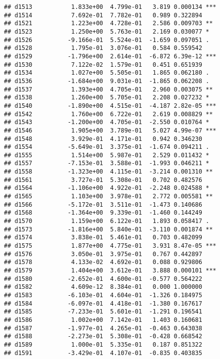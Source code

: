 \documentclass[
]{article}
\begin{document}
\begin{verbatim}
## d1513           1.833e+00  4.799e-01   3.819 0.000134 ***
## d1514           7.692e-01  7.782e-01   0.989 0.322894    
## d1521           1.223e+00  4.728e-01   2.586 0.009703 ** 
## d1523           1.250e+00  5.763e-01   2.169 0.030077 *  
## d1526          -9.166e-01  5.524e-01  -1.659 0.097051 .  
## d1528           1.795e-01  3.076e-01   0.584 0.559542    
## d1529          -1.796e+00  2.614e-01  -6.872 6.39e-12 ***
## d1530           7.122e-02  1.579e-01   0.451 0.651939    
## d1534           1.027e+00  5.505e-01   1.865 0.062180 .  
## d1536          -1.684e+00  9.031e-01  -1.865 0.062208 .  
## d1537           1.393e+00  4.705e-01   2.960 0.003075 ** 
## d1538           1.260e+00  5.705e-01   2.208 0.027232 *  
## d1540          -1.890e+00  4.515e-01  -4.187 2.82e-05 ***
## d1542           1.760e+00  6.722e-01   2.619 0.008829 ** 
## d1543          -1.200e+00  4.705e-01  -2.550 0.010764 *  
## d1546           1.905e+00  3.789e-01   5.027 4.99e-07 ***
## d1548           3.929e-01  4.171e-01   0.942 0.346230    
## d1554          -5.649e-01  3.375e-01  -1.674 0.094211 .  
## d1555           1.514e+00  5.987e-01   2.529 0.011432 *  
## d1557          -7.153e-01  3.588e-01  -1.993 0.046211 *  
## d1558          -1.323e+00  4.115e-01  -3.214 0.001310 ** 
## d1561           3.727e-01  5.308e-01   0.702 0.482576    
## d1564          -1.106e+00  4.922e-01  -2.248 0.024588 *  
## d1565           1.103e+00  3.978e-01   2.772 0.005581 ** 
## d1566          -5.172e-01  3.511e-01  -1.473 0.140686    
## d1568          -1.364e+00  9.339e-01  -1.460 0.144249    
## d1570           1.159e+00  6.122e-01   1.893 0.058417 .  
## d1573          -1.816e+00  5.840e-01  -3.110 0.001874 ** 
## d1574           3.838e-01  5.461e-01   0.703 0.482099    
## d1575           1.877e+00  4.775e-01   3.931 8.47e-05 ***
## d1576           3.050e-01  3.975e-01   0.767 0.442897    
## d1578           4.133e-02  4.692e-01   0.088 0.929806    
## d1579           1.404e+00  3.612e-01   3.888 0.000101 ***
## d1580          -2.652e-01  4.600e-01  -0.577 0.564222    
## d1582           4.609e-12  8.384e-01   0.000 1.000000    
## d1583          -6.103e-01  4.604e-01  -1.326 0.184975    
## d1584          -6.097e-01  4.418e-01  -1.380 0.167617    
## d1585          -7.233e-01  5.601e-01  -1.291 0.196541    
## d1586           1.002e+00  7.142e-01   1.403 0.160681    
## d1587          -1.977e-01  4.265e-01  -0.463 0.643038    
## d1588          -2.273e-01  5.308e-01  -0.428 0.668542    
## d1589           1.000e-01  5.335e-01   0.187 0.851322    
## d1591          -3.429e-01  4.107e-01  -0.835 0.403835    

\end{verbatim}
\end{document}
